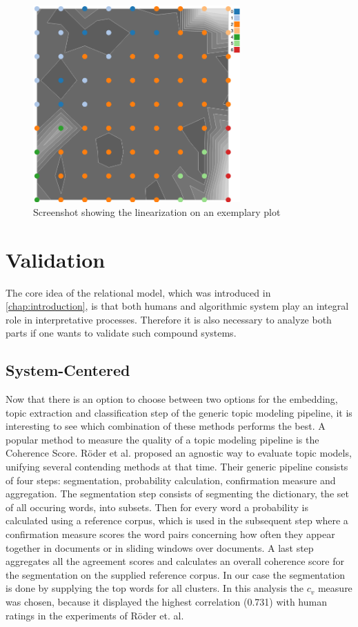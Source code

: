 \begin{figure}[htbp]
	\centering
	\includegraphics[width=300px]{../chapters/validation/pics/linearization}
	\caption{\label{pic:linearization} Screenshot showing the linearization on an exemplary plot}
\end{figure}

\section{Validation}

The core idea of the relational model, which was introduced in \autoref{chap:introduction}, is that both humans and algorithmic system play an integral role in interpretative processes. Therefore it is also necessary to analyze both parts if one wants to validate such compound systems.

\subsection{System-Centered}

Now that there is an option to choose between two options for the embedding, topic extraction and classification step of the generic topic modeling pipeline, it is interesting to see which combination of these methods performs the best. A popular method to measure the quality of a topic modeling pipeline is the Coherence Score. Röder et al.\cite{roderExploringSpaceTopic2015a} proposed an agnostic way to evaluate topic models, unifying several contending methods at that time. Their generic pipeline consists of four steps: segmentation, probability calculation, confirmation measure and aggregation. The segmentation step consists of segmenting the dictionary, the set of all occuring words, into subsets. Then for every word a probability is calculated using a reference corpus, which is used in the subsequent step where a confirmation measure scores the word pairs concerning how often they appear together in documents or in sliding windows over documents. A last step aggregates all the agreement scores and calculates an overall coherence score for the segmentation on the supplied reference corpus. In our case the segmentation is done by supplying the top words for all clusters.  In this analysis the $c_v$ measure was chosen, because it displayed the highest correlation (0.731) with human ratings in the experiments of Röder et. al.

